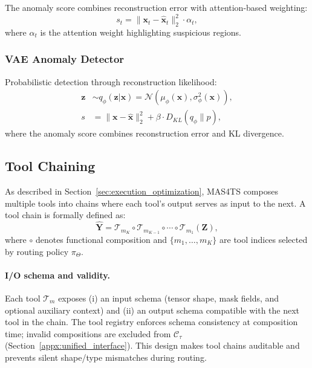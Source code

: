 The anomaly score combines reconstruction error with attention-based weighting:
\begin{equation}
    s_t = \|\mathbf{x}_t - \hat{\mathbf{x}}_t\|_2^2 \cdot \alpha_t,
\end{equation}
where $\alpha_t$ is the attention weight highlighting suspicious regions.

\subsubsection{VAE Anomaly Detector}
Probabilistic detection through reconstruction likelihood:
\begin{align}
    \mathbf{z} &\sim q_\phi(\mathbf{z}|\mathbf{x}) = \mathcal{N}(\mu_\phi(\mathbf{x}), \sigma_\phi^2(\mathbf{x})), \\
    s &= \|\mathbf{x} - \hat{\mathbf{x}}\|_2^2 + \beta \cdot D_{KL}(q_\phi \| p),
\end{align}
where the anomaly score combines reconstruction error and KL divergence.

\subsection{Tool Chaining}
\label{appx:tool_chaining}

As described in Section~\ref{sec:execution_optimization}, MAS4TS composes multiple tools into chains where each tool's output serves as input to the next. A tool chain is formally defined as:
\begin{equation}
\hat{\mathbf{Y}} = \mathcal{T}_{m_K} \circ \mathcal{T}_{m_{K-1}} \circ \cdots \circ \mathcal{T}_{m_1}(\mathbf{Z}),
\end{equation}
where $\circ$ denotes functional composition and $\{m_1, \ldots, m_K\}$ are tool indices selected by routing policy $\pi_{\Theta}$.

\paragraph{I/O schema and validity.}
Each tool $\mathcal{T}_m$ exposes (i) an input schema (tensor shape, mask fields, and optional auxiliary context) and (ii) an output schema compatible with the next tool in the chain.
The tool registry enforces schema consistency at composition time; invalid compositions are excluded from $\mathcal{C}_\tau$ (Section~\ref{appx:unified_interface}).
This design makes tool chains auditable and prevents silent shape/type mismatches during routing.

